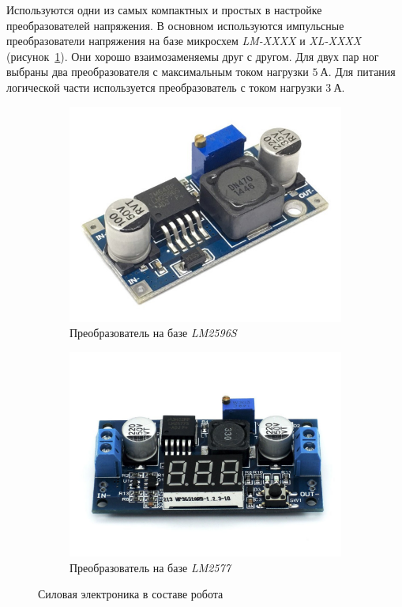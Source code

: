 Используются одни из самых компактных и простых в настройке преобразователей напряжения. В основном используются импульсные преобразователи напряжения на базе микросхем \textit{LM-XXXX} и \textit{XL-XXXX} (рисунок~\ref{fig:dcdc_converters}). Они хорошо взаимозаменяемы друг с другом. Для двух пар ног выбраны два преобразователя с максимальным током нагрузки $ 5 \: А $. Для питания логической части используется преобразователь с током нагрузки $ 3 \: А $.
\begin{figure}[ht]
    \centering
    \begin{subfigure}[b]{0.45\textwidth}    
        \centering
        \includegraphics[scale=0.30]{chapter_mechanics_construction/figure4.jpg}
        \caption{Преобразователь на базе \textit{LM2596S}}
    \end{subfigure}
    \begin{subfigure}[b]{0.45\textwidth}
        \centering
        \includegraphics[scale=0.15]{chapter_mechanics_construction/figure5.jpg}
        \caption{Преобразователь на базе \textit{LM2577}}
    \end{subfigure}
     
    \caption{Силовая электроника в составе робота}
    \label{fig:dcdc_converters}
\end{figure}

